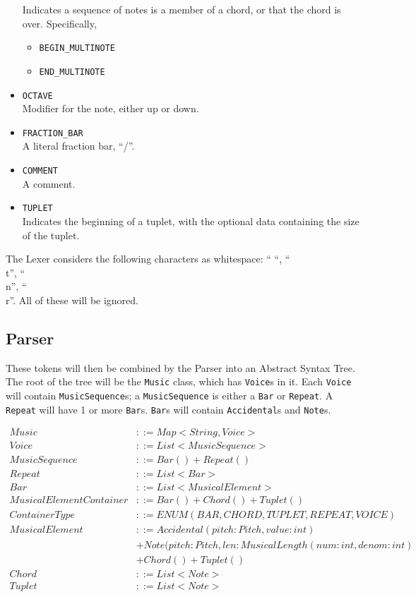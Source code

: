 \documentclass[12pt]{article}
\begin{document}
\begin{itemize}
  Indicates a sequence of notes is a member of a chord, or that the
  chord is over. Specifically,
  \begin{itemize}
  \item \texttt{BEGIN\_MULTINOTE}
  \item \texttt{END\_MULTINOTE}
  \end{itemize}
\item \texttt{OCTAVE}\\
  Modifier for the note, either up or down.
\item \texttt{FRACTION\_BAR}\\
  A literal fraction bar, ``/''.
\item \texttt{COMMENT}\\
  A comment.
\item \texttt{TUPLET}\\
  Indicates the beginning of a tuplet, with the optional data
  containing the size of the tuplet.
\end{itemize}

The Lexer considers the following characters as whitespace: `` ``,
``\\t'', ``\\n'', ``\\r''. All of these will be ignored.

\subsection{Parser}
These tokens will then be combined by the Parser into an Abstract
Syntax Tree. The root of the tree will be the \texttt{Music} class,
which has \texttt{Voice}s in it. Each \texttt{Voice} will contain
\texttt{MusicSequence}s; a \texttt{MusicSequence} is either a
\texttt{Bar} or \texttt{Repeat}. A \texttt{Repeat} will have 1 or more
\texttt{Bar}s. \texttt{Bar}s will contain \texttt{Accidental}s and
\texttt{Note}s.

\begin{align*}
  Music&::=Map<String, Voice>\\
  Voice&::=List<MusicSequence>\\
  MusicSequence&::=Bar() + Repeat()\\
  Repeat&::=List<Bar>\\
  Bar&::=List<MusicalElement>\\
  MusicalElementContainer&::=Bar()+Chord()+Tuplet()\\
  ContainerType&::=ENUM(BAR, CHORD, TUPLET, REPEAT, VOICE)\\
  MusicalElement&::=Accidental(pitch: Pitch, value: int) \\
  &+ Note(pitch: Pitch, len: MusicalLength(num: int, denom: int)\\
  &+ Chord() + Tuplet()\\
  Chord&::=List<Note>\\
  Tuplet&::=List<Note>\\
\end{align*}
\end{document}
